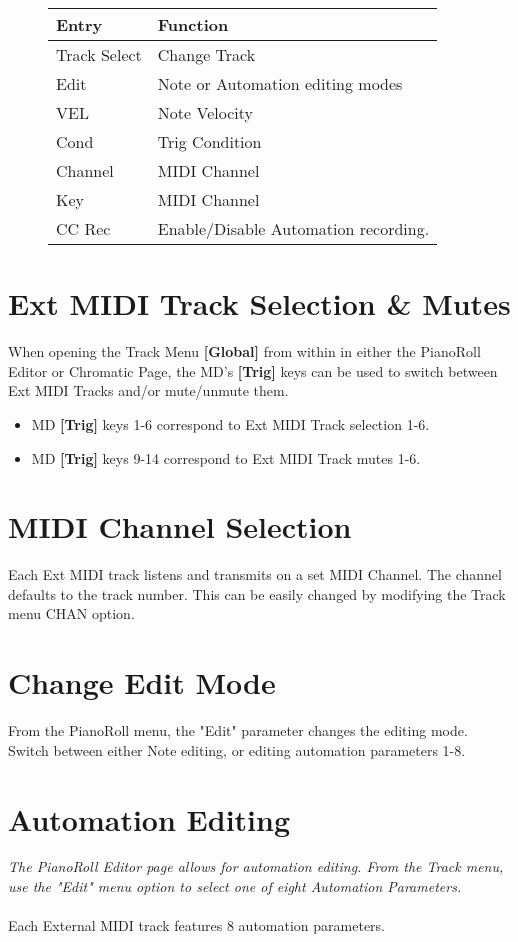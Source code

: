 \begin{figure}[hb]
    \begin{tabular}{|l|l|}
    \hline
    \rowcolor[HTML]{C0C0C0} 
    Entry        & Function \\ \hline
    Track Select & Change Track \\ \hline
    Edit         & Note or Automation editing modes\\ \hline
    VEL         & Note Velocity\\ \hline
    Cond        & Trig Condition\\ \hline
    Channel     & MIDI Channel\\ \hline
    Key         & MIDI Channel\\ \hline
    CC Rec      & Enable/Disable Automation recording.\\ \hline
    \end{tabular}
\end{figure}
\section{Ext MIDI Track Selection \& Mutes}
When opening the Track Menu \textbf{[Global]} from within in either the PianoRoll Editor or Chromatic Page, the MD's \textbf{[Trig]} keys can be used to switch between Ext MIDI Tracks and/or mute/unmute them. 
\begin{itemize}
    \item MD \textbf{[Trig]} keys 1-6 correspond to Ext MIDI Track selection 1-6.
    \item MD \textbf{[Trig]} keys 9-14 correspond to Ext MIDI Track mutes 1-6.
\end{itemize}

\section{MIDI Channel Selection}
Each Ext MIDI track listens and transmits on a set MIDI Channel. The channel defaults to the track number. This can be easily changed by modifying the Track menu CHAN option.\\
\section{Change Edit Mode}
From the PianoRoll menu, the "Edit" parameter changes the editing mode. Switch between either Note editing, or editing automation parameters 1-8.
\newpage

\section{Automation Editing}
\textit{The PianoRoll Editor page allows for automation editing. From the Track menu, use the "Edit" menu option to select one of eight Automation Parameters.}
\\\\
Each External MIDI track features 8 automation parameters.\\
